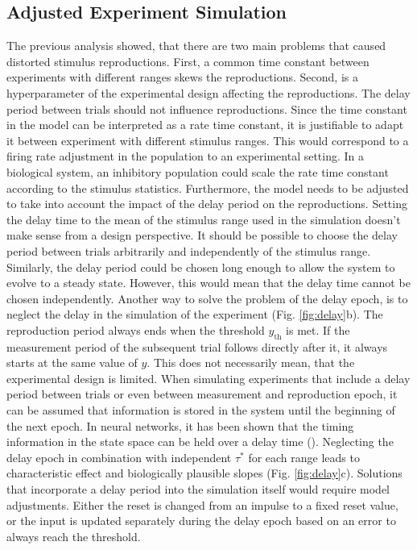 \documentclass[10pt]{article}
\begin{document}
\subsection{Adjusted Experiment Simulation}
The previous analysis showed, that there are two main problems that caused distorted stimulus reproductions. 
First, a common time constant between experiments with different ranges skews the reproductions.
Second, is a hyperparameter of the experimental design affecting the reproductions. The delay period between trials should not influence reproductions.
Since the time constant in the model can be interpreted as a rate time constant, it is justifiable to adapt it between experiment with different stimulus ranges. 
This would correspond to a firing rate adjustment in the population to an experimental setting.
In a biological system, an inhibitory population could scale the rate time constant according to the stimulus statistics.
Furthermore, the model needs to be adjusted to take into account the impact of the delay period on the reproductions. 
Setting the delay time to the mean of the stimulus range used in the simulation doesn't make sense from a design perspective. It should be possible to choose the delay period between trials arbitrarily and independently of the stimulus range. 
Similarly, the delay period could be chosen long enough to allow the system to evolve to a steady state. However, this would mean that the delay time cannot be chosen independently.
Another way to solve the problem of the delay epoch, is to neglect the delay in the simulation of the experiment (Fig. \ref{fig:delay}b).
The reproduction period always ends when the threshold $y_\text{th}$ is met. If the measurement period of the subsequent trial follows directly after it, it always starts at the same value of $y$. 
This does not necessarily mean, that the experimental design is limited. When simulating experiments that include a delay period between trials or even between measurement and reproduction epoch, it can be assumed that information is stored in the system until the beginning of the next epoch. 
In neural networks, it has been shown that the timing information in the state space can be held over a delay time (\cite{Bi2020}).
Neglecting the delay epoch in combination with independent $\tau^*$ for each range leads to characteristic effect and biologically plausible slopes (Fig. \ref{fig:delay}c).
Solutions that incorporate a delay period into the simulation itself would require model adjustments.
Either the reset is changed from an impulse to a fixed reset value, or the input is updated separately during the delay epoch based on an error to always reach the threshold. 
\end{document}

